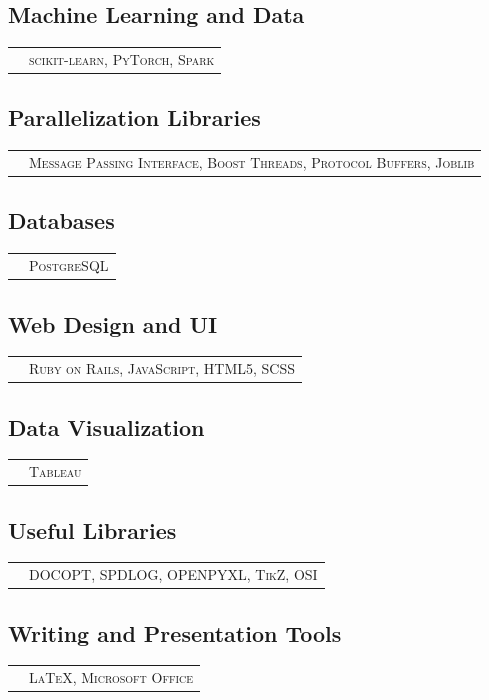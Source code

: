 \documentclass[10PT,letter]{article}
\newcommand{\subsectionstyle}[1]{\normalfont\selectfont\textcolor{titlecol}{\sffamily #1}}
\begin{document}
		  \subsection*{\subsectionstyle{Machine Learning and Data}}
		  	\begin{tabular}{p{.2in}p{5.55in}}
		  		& \textsc{scikit-learn, PyTorch, Spark}
		  	\end{tabular}
		 \subsection*{\subsectionstyle{Parallelization Libraries }}
				\begin{tabular}{p{.2in}p{5.55in}}
				 	& 	\textsc{Message Passing Interface, Boost Threads, Protocol Buffers, Joblib}
				\end{tabular}
			
		\subsection*{\subsectionstyle{Databases }}
			\begin{tabular}{p{.2in}p{5.55in}}
			& 	\textsc{PostgreSQL}
		\end{tabular}			


		\subsection*{\subsectionstyle{Web Design and UI}}
			\begin{tabular}{p{.2in}p{5.55in}}
				& \textsc{Ruby on Rails, JavaScript, HTML5, SCSS} 
			\end{tabular}

     	\subsection*{\subsectionstyle{Data Visualization}}
				\begin{tabular}{p{.2in}p{5.55in}}
					& \textsc{Tableau} 
				\end{tabular}
     	\subsection*{\subsectionstyle{Useful Libraries}}
				\begin{tabular}{p{.2in}p{5.55in}}
					& \textsc{DOCOPT,  SPDLOG, OPENPYXL, TikZ, OSI} 
				\end{tabular}

		\subsection*{\subsectionstyle{Writing and Presentation Tools}}
				\begin{tabular}{p{.2in}p{5.55in}}
					 & \textsc{\LaTeX, Microsoft Office}
				\end{tabular}
\end{document}
